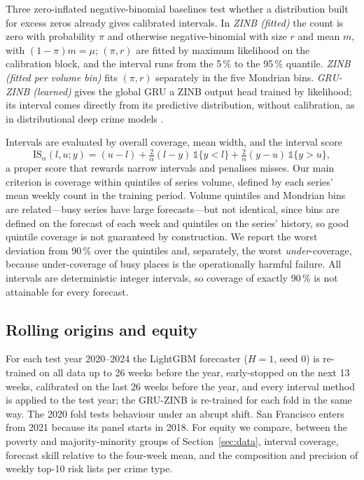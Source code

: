 \documentclass[preprint,12pt,authoryear]{elsarticle}
\begin{document}
Three zero-inflated negative-binomial baselines \citep{lambert1992zero} test whether a distribution built for excess zeros already gives calibrated intervals. In \emph{ZINB (fitted)} the count is zero with probability $\pi$ and otherwise negative-binomial with size $r$ and mean $m$, with $(1-\pi)m=\mu$; $(\pi,r)$ are fitted by maximum likelihood on the calibration block, and the interval runs from the 5\,\% to the 95\,\% quantile. \emph{ZINB (fitted per volume bin)} fits $(\pi,r)$ separately in the five Mondrian bins. \emph{GRU-ZINB (learned)} gives the global GRU a ZINB output head trained by likelihood; its interval comes directly from its predictive distribution, without calibration, as in distributional deep crime models \citep{wang2024uncertainty}.

Intervals are evaluated by overall coverage, mean width, and the interval score \citep{gneiting2007strictly}
\begin{equation}
\mathrm{IS}_\alpha(l,u;y)=(u-l)+\tfrac{2}{\alpha}(l-y)\,\mathbb{1}\{y<l\}+\tfrac{2}{\alpha}(y-u)\,\mathbb{1}\{y>u\},
\end{equation}
a proper score that rewards narrow intervals and penalises misses. Our main criterion is coverage within quintiles of series volume, defined by each series' mean weekly count in the training period. Volume quintiles and Mondrian bins are related---busy series have large forecasts---but not identical, since bins are defined on the forecast of each week and quintiles on the series' history, so good quintile coverage is not guaranteed by construction. We report the worst deviation from 90\,\% over the quintiles and, separately, the worst \emph{under}-coverage, because under-coverage of busy places is the operationally harmful failure. All intervals are deterministic integer intervals, so coverage of exactly 90\,\% is not attainable for every forecast.

\subsection{Rolling origins and equity}\label{sec:rolling-equity}
For each test year 2020--2024 the LightGBM forecaster ($H=1$, seed 0) is re-trained on all data up to 26 weeks before the year, early-stopped on the next 13 weeks, calibrated on the last 26 weeks before the year, and every interval method is applied to the test year; the GRU-ZINB is re-trained for each fold in the same way. The 2020 fold tests behaviour under an abrupt shift. San Francisco enters from 2021 because its panel starts in 2018. For equity we compare, between the poverty and majority-minority groups of Section~\ref{sec:data}, interval coverage, forecast skill relative to the four-week mean, and the composition and precision of weekly top-10 risk lists per crime type.
\end{document}
